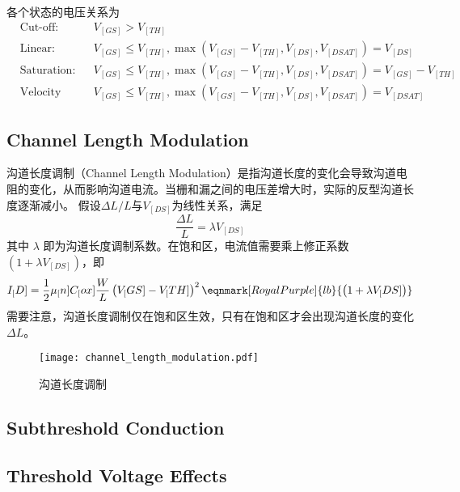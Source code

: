 各个状态的电压关系为
\begin{equation}
    \begin{aligned}
        & \text{Cut-off:} && V_[GS] > V_[TH] \\
        & \text{Linear:} && V_[GS] \leqslant V_[TH], \max \left(V_[GS] - V_[TH], V_[DS], V_[DSAT]\right) = V_[DS] \\
        & \text{Saturation:} && V_[GS] \leqslant V_[TH], \max \left(V_[GS] - V_[TH], V_[DS], V_[DSAT]\right) = V_[GS] - V_[TH] \\
        & \text{Velocity Saturation:} && V_[GS] \leqslant V_[TH], \max \left(V_[GS] - V_[TH], V_[DS], V_[DSAT]\right) = V_[DSAT]
    \end{aligned}
\end{equation}

\subsection{Channel Length Modulation}
沟道长度调制（Channel Length Modulation）是指沟道长度的变化会导致沟道电阻的变化，从而影响沟道电流。当栅和漏之间的电压差增大时，实际的反型沟道长度逐渐减小。
假设$\Delta L / L$与$V_[DS]$为线性关系，满足
\begin{equation}
    \frac{\Delta L}{L} = \lambda V_[DS]
\end{equation}
其中 $\lambda$ 即为沟道长度调制系数。在饱和区，电流值需要乘上修正系数 $\left(1 + \lambda V_[DS]\right)$，即
\begin{equation}
    I_[D] = \frac{1}{2} \mu_[n] C_[ox] \frac{W}{L} \left( V_[GS] - V_[TH] \right)^2 \eqnmark[RoyalPurple]{lb}{\left( 1 + \lambda V_[DS] \right)}
\end{equation}
需要注意，沟道长度调制仅在饱和区生效，只有在饱和区才会出现沟道长度的变化$\Delta L$。

\begin{figure}
    \centering
    \texttt{[image: channel\_length\_modulation.pdf]}
    \caption{沟道长度调制\cite{NeamenSemiconductor}}
    \label{fig:channel_length_modulation}
\end{figure}

\subsection{Subthreshold Conduction}

\subsection{Threshold Voltage Effects}
